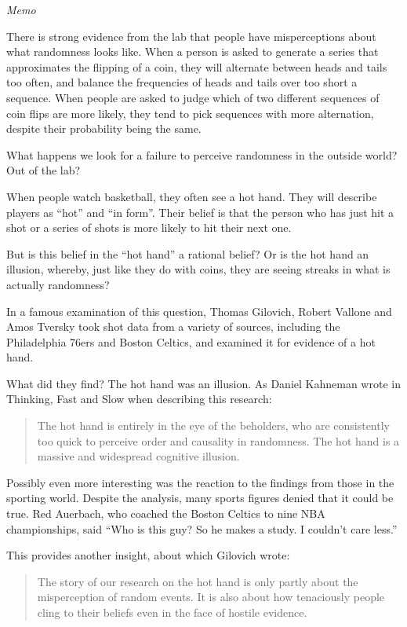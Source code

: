 \documentclass[
]{book}
\begin{document}
\emph{Memo}

There is strong evidence from the lab that people have misperceptions about what randomness looks like. When a person is asked to generate a series that approximates the flipping of a coin, they will alternate between heads and tails too often, and balance the frequencies of heads and tails over too short a sequence. When people are asked to judge which of two different sequences of coin flips are more likely, they tend to pick sequences with more alternation, despite their probability being the same.

What happens we look for a failure to perceive randomness in the outside world? Out of the lab?

When people watch basketball, they often see a hot hand. They will describe players as ``hot'' and ``in form''. Their belief is that the person who has just hit a shot or a series of shots is more likely to hit their next one.

But is this belief in the ``hot hand'' a rational belief? Or is the hot hand an illusion, whereby, just like they do with coins, they are seeing streaks in what is actually randomness?

In a famous examination of this question, Thomas Gilovich, Robert Vallone and Amos Tversky took shot data from a variety of sources, including the Philadelphia 76ers and Boston Celtics, and examined it for evidence of a hot hand.

What did they find? The hot hand was an illusion. As Daniel Kahneman wrote in Thinking, Fast and Slow when describing this research:

\begin{quote}
The hot hand is entirely in the eye of the beholders, who are consistently too quick to perceive order and causality in randomness. The hot hand is a massive and widespread cognitive illusion.
\end{quote}

Possibly even more interesting was the reaction to the findings from those in the sporting world. Despite the analysis, many sports figures denied that it could be true. Red Auerbach, who coached the Boston Celtics to nine NBA championships, said ``Who is this guy? So he makes a study. I couldn't care less.''

This provides another insight, about which Gilovich wrote:

\begin{quote}
The story of our research on the hot hand is only partly about the misperception of random events. It is also about how tenaciously people cling to their beliefs even in the face of hostile evidence.
\end{quote}
\end{document}
